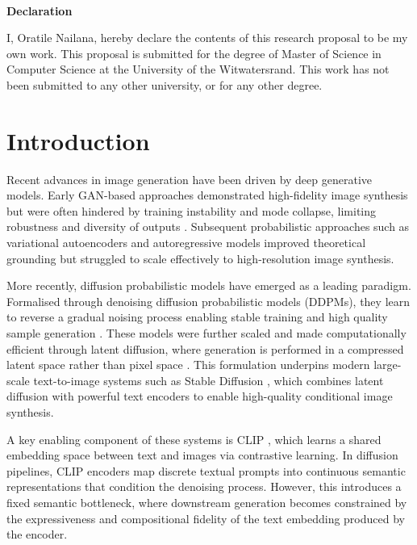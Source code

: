 \documentclass[a4paper,twoside,12pt]{report}
\newenvironment{declaration}{\ \vfill\begin{center}\textbf{Declaration}\end{center}\addcontentsline{toc}{section}{Declaration}}{\vfill\vfill\newpage}
\begin{document}
\begin{declaration}
I, Oratile Nailana, hereby declare the contents of this research proposal to be my own work.
This proposal is submitted for the degree of Master of Science in Computer Science at the University of the Witwatersrand.
This work has not been submitted to any other university, or for any other degree.
\end{declaration}




{}
\tableofcontents
\newpage
{}
\newpage
\newpage
{}

\chapter{Introduction}
Recent advances in image generation have been driven by deep generative models. Early GAN-based approaches demonstrated high-fidelity image synthesis but were often hindered by training instability and mode collapse, limiting robustness and diversity of outputs \citep{goodfellow2014generative, salimans2016improved, arjovsky2017wasserstein}. Subsequent probabilistic approaches such as variational autoencoders and autoregressive models improved
theoretical grounding but struggled to scale effectively to high-resolution image synthesis\citep{kingma2013auto, rezende2014stochastic}. 


More recently, diffusion probabilistic models have emerged as a leading paradigm. Formalised through denoising diffusion probabilistic models (DDPMs), they learn to reverse a gradual noising process enabling stable training and
high quality sample generation \citep{ho2020ddpm, song2021score}. These models were further scaled and made computationally efficient through latent diffusion, where generation is performed in a compressed latent space rather than pixel space \citep{rombach2022ldm}. This formulation underpins modern large-scale text-to-image systems such as Stable Diffusion \citep{rombach2022ldm}, which combines latent diffusion with powerful text encoders to enable high-quality conditional image synthesis.

A key enabling component of these systems is CLIP \citep{radford2021clip}, which learns a shared embedding space between text and images via contrastive learning. In diffusion pipelines, CLIP encoders map discrete textual prompts into continuous semantic representations that condition the denoising process. However, this introduces a fixed semantic bottleneck, where downstream generation becomes constrained by the expressiveness and compositional fidelity of the text embedding produced by the encoder.
\end{document}
